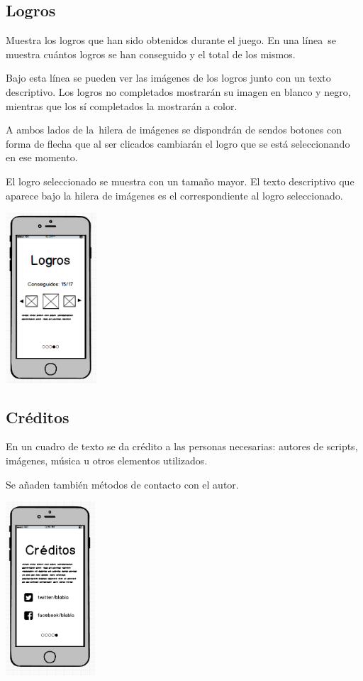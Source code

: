 \subsection[Logros]{ Logros}
\hypertarget{Toc484614217}{}{
Muestra los logros que han sido obtenidos durante el juego. En una l\'inea\ se muestra cu\'antos logros se han
conseguido y el total de los mismos.\ }

{
Bajo esta l\'inea se pueden ver las im\'agenes de los logros junto con un texto descriptivo. Los logros no completados
mostrar\'an su imagen en blanco y negro, mientras que los s\'i completados la mostrar\'an a color.\ }

{
A ambos lados de la\ hilera de im\'agenes se dispondr\'an de sendos botones con forma de flecha que al ser clicados
cambiar\'an el logro que se est\'a seleccionando en ese momento.}

{
El logro seleccionado se muestra con un tama\~no mayor. El texto descriptivo que aparece bajo la hilera de im\'agenes es
el correspondiente al logro seleccionado.\ }

 \includegraphics[width=1.35737in,height=2.49485in]{anexos/GDD/GDD-img003.png} 

\subsection[Cr\'editos]{ Cr\'editos}
\hypertarget{Toc484614218}{}{
En un cuadro de texto se da cr\'edito a las personas necesarias: autores de scripts, im\'agenes, m\'usica u otros
elementos utilizados.}

{
Se a\~naden tambi\'en m\'etodos de contacto con el autor.}

 \includegraphics[width=1.30933in,height=2.548in]{anexos/GDD/GDD-img004.png} 

